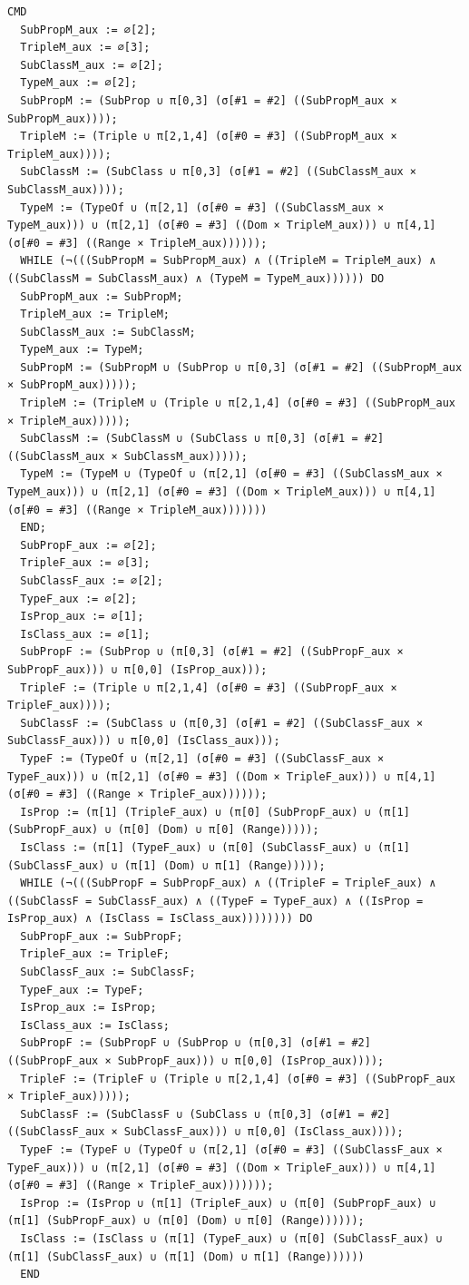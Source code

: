 \documentclass[10pt]{article}
\begin{document}
\begin{Verbatim}[fontsize=\tiny,breaklines=true,breakanywhere=true,frame=single,framesep=1.5mm]
CMD
  SubPropM_aux := ∅[2];
  TripleM_aux := ∅[3];
  SubClassM_aux := ∅[2];
  TypeM_aux := ∅[2];
  SubPropM := (SubProp ∪ π[0,3] (σ[#1 = #2] ((SubPropM_aux × SubPropM_aux))));
  TripleM := (Triple ∪ π[2,1,4] (σ[#0 = #3] ((SubPropM_aux × TripleM_aux))));
  SubClassM := (SubClass ∪ π[0,3] (σ[#1 = #2] ((SubClassM_aux × SubClassM_aux))));
  TypeM := (TypeOf ∪ (π[2,1] (σ[#0 = #3] ((SubClassM_aux × TypeM_aux))) ∪ (π[2,1] (σ[#0 = #3] ((Dom × TripleM_aux))) ∪ π[4,1] (σ[#0 = #3] ((Range × TripleM_aux))))));
  WHILE (¬(((SubPropM = SubPropM_aux) ∧ ((TripleM = TripleM_aux) ∧ ((SubClassM = SubClassM_aux) ∧ (TypeM = TypeM_aux)))))) DO
  SubPropM_aux := SubPropM;
  TripleM_aux := TripleM;
  SubClassM_aux := SubClassM;
  TypeM_aux := TypeM;
  SubPropM := (SubPropM ∪ (SubProp ∪ π[0,3] (σ[#1 = #2] ((SubPropM_aux × SubPropM_aux)))));
  TripleM := (TripleM ∪ (Triple ∪ π[2,1,4] (σ[#0 = #3] ((SubPropM_aux × TripleM_aux)))));
  SubClassM := (SubClassM ∪ (SubClass ∪ π[0,3] (σ[#1 = #2] ((SubClassM_aux × SubClassM_aux)))));
  TypeM := (TypeM ∪ (TypeOf ∪ (π[2,1] (σ[#0 = #3] ((SubClassM_aux × TypeM_aux))) ∪ (π[2,1] (σ[#0 = #3] ((Dom × TripleM_aux))) ∪ π[4,1] (σ[#0 = #3] ((Range × TripleM_aux)))))))
  END;
  SubPropF_aux := ∅[2];
  TripleF_aux := ∅[3];
  SubClassF_aux := ∅[2];
  TypeF_aux := ∅[2];
  IsProp_aux := ∅[1];
  IsClass_aux := ∅[1];
  SubPropF := (SubProp ∪ (π[0,3] (σ[#1 = #2] ((SubPropF_aux × SubPropF_aux))) ∪ π[0,0] (IsProp_aux)));
  TripleF := (Triple ∪ π[2,1,4] (σ[#0 = #3] ((SubPropF_aux × TripleF_aux))));
  SubClassF := (SubClass ∪ (π[0,3] (σ[#1 = #2] ((SubClassF_aux × SubClassF_aux))) ∪ π[0,0] (IsClass_aux)));
  TypeF := (TypeOf ∪ (π[2,1] (σ[#0 = #3] ((SubClassF_aux × TypeF_aux))) ∪ (π[2,1] (σ[#0 = #3] ((Dom × TripleF_aux))) ∪ π[4,1] (σ[#0 = #3] ((Range × TripleF_aux))))));
  IsProp := (π[1] (TripleF_aux) ∪ (π[0] (SubPropF_aux) ∪ (π[1] (SubPropF_aux) ∪ (π[0] (Dom) ∪ π[0] (Range)))));
  IsClass := (π[1] (TypeF_aux) ∪ (π[0] (SubClassF_aux) ∪ (π[1] (SubClassF_aux) ∪ (π[1] (Dom) ∪ π[1] (Range)))));
  WHILE (¬(((SubPropF = SubPropF_aux) ∧ ((TripleF = TripleF_aux) ∧ ((SubClassF = SubClassF_aux) ∧ ((TypeF = TypeF_aux) ∧ ((IsProp = IsProp_aux) ∧ (IsClass = IsClass_aux)))))))) DO
  SubPropF_aux := SubPropF;
  TripleF_aux := TripleF;
  SubClassF_aux := SubClassF;
  TypeF_aux := TypeF;
  IsProp_aux := IsProp;
  IsClass_aux := IsClass;
  SubPropF := (SubPropF ∪ (SubProp ∪ (π[0,3] (σ[#1 = #2] ((SubPropF_aux × SubPropF_aux))) ∪ π[0,0] (IsProp_aux))));
  TripleF := (TripleF ∪ (Triple ∪ π[2,1,4] (σ[#0 = #3] ((SubPropF_aux × TripleF_aux)))));
  SubClassF := (SubClassF ∪ (SubClass ∪ (π[0,3] (σ[#1 = #2] ((SubClassF_aux × SubClassF_aux))) ∪ π[0,0] (IsClass_aux))));
  TypeF := (TypeF ∪ (TypeOf ∪ (π[2,1] (σ[#0 = #3] ((SubClassF_aux × TypeF_aux))) ∪ (π[2,1] (σ[#0 = #3] ((Dom × TripleF_aux))) ∪ π[4,1] (σ[#0 = #3] ((Range × TripleF_aux)))))));
  IsProp := (IsProp ∪ (π[1] (TripleF_aux) ∪ (π[0] (SubPropF_aux) ∪ (π[1] (SubPropF_aux) ∪ (π[0] (Dom) ∪ π[0] (Range))))));
  IsClass := (IsClass ∪ (π[1] (TypeF_aux) ∪ (π[0] (SubClassF_aux) ∪ (π[1] (SubClassF_aux) ∪ (π[1] (Dom) ∪ π[1] (Range))))))
  END


\end{Verbatim}
\end{document}
